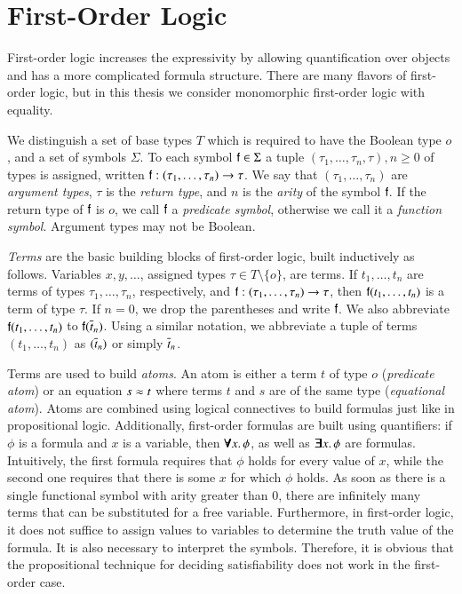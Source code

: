 \section{First-Order Logic}
\label{sec:pre:fol}

First-order logic increases the expressivity by allowing quantification over
objects and has a more complicated formula structure. There are many flavors of
first-order logic, but in this thesis we consider monomorphic first-order logic
with equality.

We distinguish a set of base types $T$ which is required to have the Boolean
type $o$, and a set of symbols $\Sigma$. To each symbol $\mathsf{f} \in \Sigma$ a
tuple $(\tau_1, \ldots, \tau_{n}, \tau), n \geq 0$ of types is assigned, written
$\mathsf{f} : (\tau_1, \ldots, \tau_{n}) \rightarrow \tau$. We say that $(\tau_1,
\ldots, \tau_{n})$ are \emph{argument types}, $\tau$ is the \emph{return type}, and $n$
is the \emph{arity} of the symbol $\mathsf{f}$. If the return type of $\mathsf{f}$ is $o$, we call
$\mathsf{f}$ a \emph{predicate symbol}, otherwise we call it a \emph{function symbol}. Argument types may not be Boolean.

\emph{Terms} are the basic building blocks of first-order logic, built inductively as follows. Variables
$x,y,\ldots$, assigned types $\tau \in T\setminus \{ o \}$, are terms. If $t_1,\ldots,t_n$ are
terms of types $\tau_1, \ldots, \tau_n$, respectively, and $\mathsf{f} : (\tau_1,
\ldots, \tau_{n}) \rightarrow \tau$, then $\mathsf{f}(t_1, \ldots, t_n)$ is a term
of type $\tau$. If $n=0$, we drop the parentheses and write $\mathsf{f}$. We also
abbreviate $\mathsf{f}(t_1, \ldots, t_n)$ to $\mathsf{f}(\overline{t}_{n})$. Using a similar
notation, we abbreviate a tuple of terms $(t_1, \ldots, t_n)$ as $(\overline{t}_{n})$
or simply $\overline{t}_{n}$.

Terms are used to build \emph{atoms}. An atom is either a term $t$ of type $o$ (\emph{predicate atom}) or an
equation $s \approx t$ where terms $t$ and $s$ are of the same type (\emph{equational atom}). Atoms are
combined using logical connectives to build formulas just like in propositional
logic. Additionally, first-order formulas are built using quantifiers: if $\phi$
is a formula and $x$ is a variable, then $\pmb{\forall} x.\, \phi$, as well as
$\pmb{\exists} x.\, \phi$ are formulas. Intuitively, the first formula requires that $\phi$ holds
for every value of $x$, while the second one requires that there is some $x$ for
which $\phi$ holds. As soon as there is a single functional symbol with arity
greater than 0, there are infinitely many terms that can be substituted for a
free variable. Furthermore, in first-order logic, it does not suffice to assign
values to variables to determine the truth value of the formula. It is also
necessary to interpret the symbols. Therefore, it is obvious that the propositional
technique for deciding satisfiability does not work in the first-order case.

